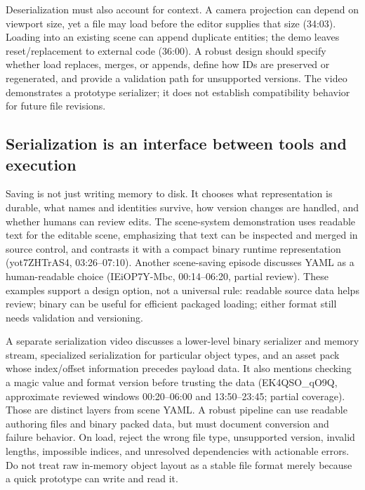 Deserialization must also account for context. A camera projection can depend on viewport size, yet a file may load before the editor supplies that size (34:03). Loading into an existing scene can append duplicate entities; the demo leaves reset/replacement to external code (36:00). A robust design should specify whether load replaces, merges, or appends, define how IDs are preserved or regenerated, and provide a validation path for unsupported versions. The video demonstrates a prototype serializer; it does not establish compatibility behavior for future file revisions.

\subsection{Serialization is an interface between tools and execution}\label{06-engine-ii-ch033-serialization-is-an-interface-between-tools-and-execution}

\hypertarget{06-engine-ii-ch033-serialization-is-an-interface-between-tools-and-execution}{}

Saving is not just writing memory to disk. It chooses what representation is durable, what names and identities survive, how version changes are handled, and whether humans can review edits. The scene-system demonstration uses readable text for the editable scene, emphasizing that text can be inspected and merged in source control, and contrasts it with a compact binary runtime representation (yot7ZHTrAS4, 03:26--07:10). Another scene-saving episode discusses YAML as a human-readable choice (IEiOP7Y-Mbc, 00:14--06:20, partial review). These examples support a design option, not a universal rule: readable source data helps review; binary can be useful for efficient packaged loading; either format still needs validation and versioning.

A separate serialization video discusses a lower-level binary serializer and memory stream, specialized serialization for particular object types, and an asset pack whose index/offset information precedes payload data. It also mentions checking a magic value and format version before trusting the data (EK4QSO\_qO9Q, approximate reviewed windows 00:20--06:00 and 13:50--23:45; partial coverage). Those are distinct layers from scene YAML. A robust pipeline can use readable authoring files and binary packed data, but must document conversion and failure behavior. On load, reject the wrong file type, unsupported version, invalid lengths, impossible indices, and unresolved dependencies with actionable errors. Do not treat raw in-memory object layout as a stable file format merely because a quick prototype can write and read it.

